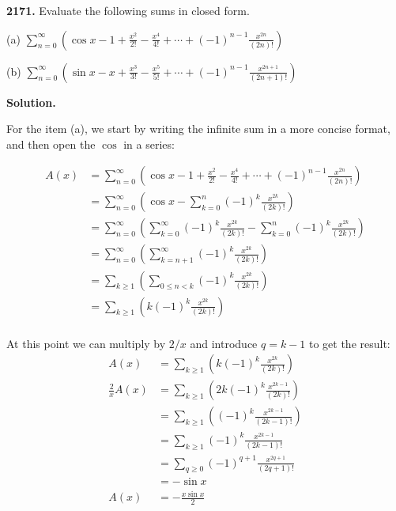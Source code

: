 \documentclass{letter}
\begin{document}
\newtheorem{lemma}{Lemma}
\newcommand\term[1]{\frac{x^{#1}}{#1!}}

\begin{letter}{}

  \textbf{2171.} Evaluate the following sums in closed form.

  (a) $\displaystyle{\sum_{n=0}^{\infty}\left(\cos x -1 +\term{2}-\term{4}+\cdots+
    \left(-1\right)^{n-1}\frac{x^{2n}}{\left(2n\right)!}   \right)}$

  (b) $\displaystyle{\sum_{n=0}^{\infty}\left(\sin x -x +\term{3}-\term{5}+\cdots+
    \left(-1\right)^{n-1}\frac{x^{2n+1}}{\left(2n+1\right)!}   \right)}$
  
  \textbf{Solution.}

  For the item (a), we start by writing the infinite sum in a more concise format, and then open the $\cos$ in a series:

  \begin{align*}
  A(x) &= \sum_{n=0}^{\infty}\left(\cos x -1 +\term{2}-\term{4}+\cdots+
    \left(-1\right)^{n-1}\frac{x^{2n}}{\left(2n\right)!}   \right) \\
       &= \sum_{n=0}^{\infty}\left(\cos x 
    -\sum_{k=0}^{n}\left(-1\right)^k \frac{x^{2k}}{(2k)!} \right)\\
       &= \sum_{n=0}^{\infty}\left(
    \sum_{k=0}^{\infty}\left(-1\right)^k \frac{x^{2k}}{(2k)!} 
    -\sum_{k=0}^{n}\left(-1\right)^k \frac{x^{2k}}{(2k)!} \right) \\
       &= \sum_{n=0}^{\infty}\left(
    \sum_{k=n+1}^{\infty}\left(-1\right)^k \frac{x^{2k}}{(2k)!} \right)\\
       &= \sum_{k\ge 1}\left(
    \sum_{0\le n < k}\left(-1\right)^k \frac{x^{2k}}{(2k)!} \right)\\
       &= \sum_{k\ge 1}\left(k
    \left(-1\right)^k \frac{x^{2k}}{(2k)!} \right)\\
  \end{align*}

  At this point we can multiply by $2/x$ and introduce $q=k-1$ to get the result:
  \begin{align*}
  A(x) &= \sum_{k\ge 1}\left(k\left(-1\right)^k \frac{x^{2k}}{(2k)!} \right) \\
  \frac{2}{x}A(x) &= \sum_{k\ge 1}\left(2k\left(-1\right)^k \frac{x^{2k-1}}{(2k)!} \right) \\
    &= \sum_{k\ge 1}\left(\left(-1\right)^k \frac{x^{2k-1}}{(2k-1)!} \right) \\
    &= \sum_{k\ge 1}\left(-1\right)^k \frac{x^{2k-1}}{(2k-1)!} \\
    &= \sum_{q\ge 0}\left(-1\right)^{q+1} \frac{x^{2q+1}}{(2q+1)!} \\
    &= -\sin x \\
  A(x) &= -\frac{x\sin x}{2}\\
  \end{align*}
  

\end{letter}
\end{document}
